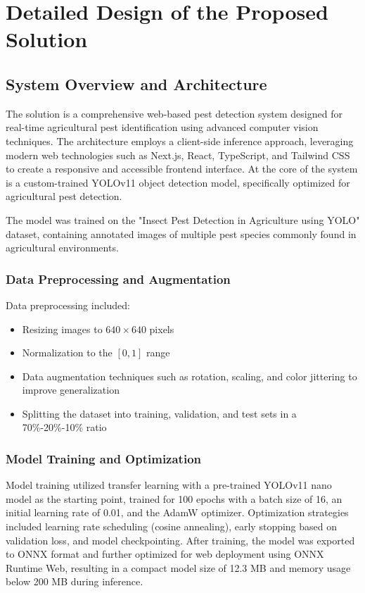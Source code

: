 \section{Detailed Design of the Proposed Solution}
\label{sec:detailed_design}

\subsection{System Overview and Architecture}
The solution is a comprehensive web-based pest detection system designed for real-time agricultural pest identification using advanced computer vision techniques. The architecture employs a client-side inference approach, leveraging modern web technologies such as Next.js, React, TypeScript, and Tailwind CSS to create a responsive and accessible frontend interface. At the core of the system is a custom-trained YOLOv11 object detection model, specifically optimized for agricultural pest detection.

The model was trained on the "Insect Pest Detection in Agriculture using YOLO" dataset, containing annotated images of multiple pest species commonly found in agricultural environments.

\subsubsection{Data Preprocessing and Augmentation}
Data preprocessing included:
\begin{itemize}
    \item Resizing images to $640 \times 640$ pixels
    \item Normalization to the $[0, 1]$ range
    \item Data augmentation techniques such as rotation, scaling, and color jittering to improve generalization
    \item Splitting the dataset into training, validation, and test sets in a 70\%-20\%-10\% ratio
\end{itemize}

\subsubsection{Model Training and Optimization}
Model training utilized transfer learning with a pre-trained YOLOv11 nano model as the starting point, trained for 100 epochs with a batch size of 16, an initial learning rate of 0.01, and the AdamW optimizer. Optimization strategies included learning rate scheduling (cosine annealing), early stopping based on validation loss, and model checkpointing. After training, the model was exported to ONNX format and further optimized for web deployment using ONNX Runtime Web, resulting in a compact model size of 12.3 MB and memory usage below 200 MB during inference.

